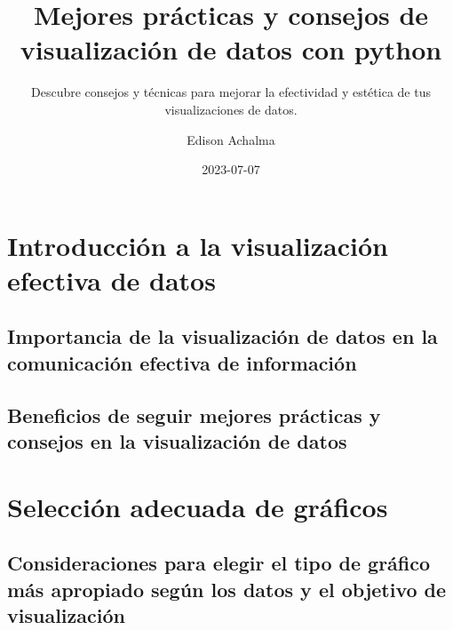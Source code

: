 \documentclass[
  a4paper,
]{article}
\title{Mejores prácticas y consejos de visualización de datos con
python}
\subtitle{Descubre consejos y técnicas para mejorar la efectividad y
estética de tus visualizaciones de datos.}
\author{Edison Achalma}
\date{2023-07-07}
\begin{document}
\maketitle
\ifdefined\Shaded\renewenvironment{Shaded}{\begin{tcolorbox}[interior hidden, enhanced, frame hidden, breakable, sharp corners, borderline west={3pt}{0pt}{shadecolor}, boxrule=0pt]}{\end{tcolorbox}}\fi

\hypertarget{introducciuxf3n-a-la-visualizaciuxf3n-efectiva-de-datos}{%
\section{Introducción a la visualización efectiva de
datos}\label{introducciuxf3n-a-la-visualizaciuxf3n-efectiva-de-datos}}

\hypertarget{importancia-de-la-visualizaciuxf3n-de-datos-en-la-comunicaciuxf3n-efectiva-de-informaciuxf3n}{%
\subsection{Importancia de la visualización de datos en la comunicación
efectiva de
información}\label{importancia-de-la-visualizaciuxf3n-de-datos-en-la-comunicaciuxf3n-efectiva-de-informaciuxf3n}}

\hypertarget{beneficios-de-seguir-mejores-pruxe1cticas-y-consejos-en-la-visualizaciuxf3n-de-datos}{%
\subsection{Beneficios de seguir mejores prácticas y consejos en la
visualización de
datos}\label{beneficios-de-seguir-mejores-pruxe1cticas-y-consejos-en-la-visualizaciuxf3n-de-datos}}

\hypertarget{selecciuxf3n-adecuada-de-gruxe1ficos}{%
\section{Selección adecuada de
gráficos}\label{selecciuxf3n-adecuada-de-gruxe1ficos}}

\hypertarget{consideraciones-para-elegir-el-tipo-de-gruxe1fico-muxe1s-apropiado-seguxfan-los-datos-y-el-objetivo-de-visualizaciuxf3n}{%
\subsection{Consideraciones para elegir el tipo de gráfico más apropiado
según los datos y el objetivo de
visualización}\label{consideraciones-para-elegir-el-tipo-de-gruxe1fico-muxe1s-apropiado-seguxfan-los-datos-y-el-objetivo-de-visualizaciuxf3n}}
\end{document}

